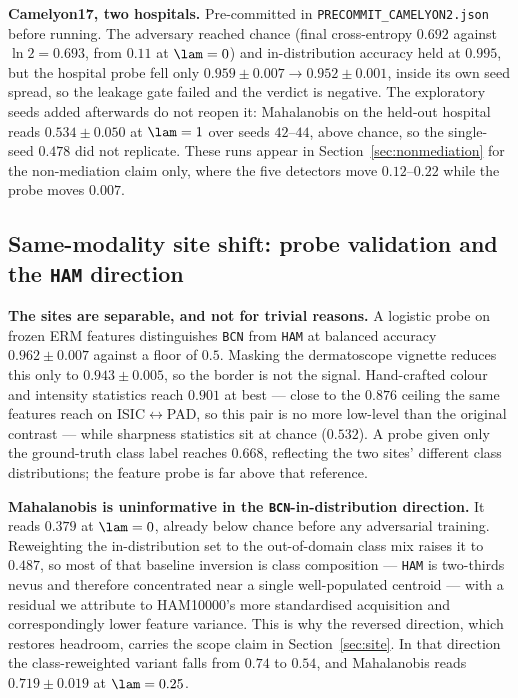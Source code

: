 \textbf{Camelyon17, two hospitals.} Pre-committed in
\texttt{PRECOMMIT\_CAMELYON2.json} before running. The adversary reached chance
(final cross-entropy $0.692$ against $\ln 2 = 0.693$, from $0.11$ at $\lam = 0$) and
in-distribution accuracy held at $0.995$, but the hospital probe fell only
$0.959 \pm 0.007 \to 0.952 \pm 0.001$, inside its own seed spread, so the leakage gate
failed and the verdict is negative. The exploratory seeds added afterwards do not
reopen it: Mahalanobis on the held-out hospital reads $0.534 \pm 0.050$ at $\lam = 1$
over seeds $42$--$44$, above chance, so the single-seed $0.478$ did not replicate.
These runs appear in Section~\ref{sec:nonmediation} for the non-mediation claim only,
where the five detectors move $0.12$--$0.22$ while the probe moves $0.007$.

\subsection{Same-modality site shift: probe validation and the \texttt{HAM} direction}
\label{app:site}

\textbf{The sites are separable, and not for trivial reasons.} A logistic probe on
frozen ERM features distinguishes \texttt{BCN} from \texttt{HAM} at balanced accuracy
$0.962 \pm 0.007$ against a floor of $0.5$. Masking the dermatoscope vignette reduces
this only to $0.943 \pm 0.005$, so the border is not the signal. Hand-crafted colour
and intensity statistics reach $0.901$ at best --- close to the $0.876$ ceiling the
same features reach on ISIC$\leftrightarrow$PAD, so this pair is no more low-level than
the original contrast --- while sharpness statistics sit at chance ($0.532$). A probe
given only the ground-truth class label reaches $0.668$, reflecting the two sites'
different class distributions; the feature probe is far above that reference.

\textbf{Mahalanobis is uninformative in the \texttt{BCN}-in-distribution direction.} It
reads $0.379$ at $\lam = 0$, already below chance before any adversarial training.
Reweighting the in-distribution set to the out-of-domain class mix raises it to
$0.487$, so most of that baseline inversion is class composition --- \texttt{HAM} is
two-thirds nevus and therefore concentrated near a single well-populated centroid ---
with a residual we attribute to HAM10000's more standardised acquisition and
correspondingly lower feature variance. This is why the reversed direction, which
restores headroom, carries the scope claim in Section~\ref{sec:site}. In that
direction the class-reweighted variant falls from $0.74$ to $0.54$, and Mahalanobis
reads $0.719 \pm 0.019$ at $\lam = 0.25$.

